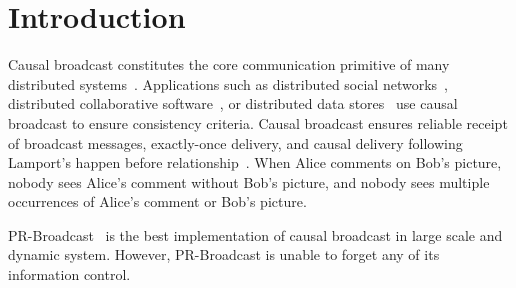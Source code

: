  
\section{Introduction}


Causal broadcast constitutes the core communication primitive of many
distributed systems~\cite{hadzilacos1994modular}. Applications such as
distributed social networks~\cite{borthakur2013petabyte}, distributed
collaborative software~\cite{heinrich2012exploiting,nedelec2016crate}, or
distributed data
stores~\cite{bailis2013bolton,bravo2017saturn,demers1987epidemic,lloyd2011cops,shapiro2011comprehensive}
use causal broadcast to ensure consistency criteria.  Causal broadcast ensures
reliable receipt of broadcast messages, exactly-once delivery, and causal
delivery following Lamport's happen before
relationship~\cite{lamport1978time}. When Alice comments on Bob's picture,
nobody sees Alice's comment without Bob's picture, and nobody sees multiple
occurrences of Alice's comment or Bob's picture.

PR-Broadcast~\cite{SRDS} is the best implementation of causal
broadcast in large scale and dynamic system. However, PR-Broadcast is
unable to forget any of its information control.  





